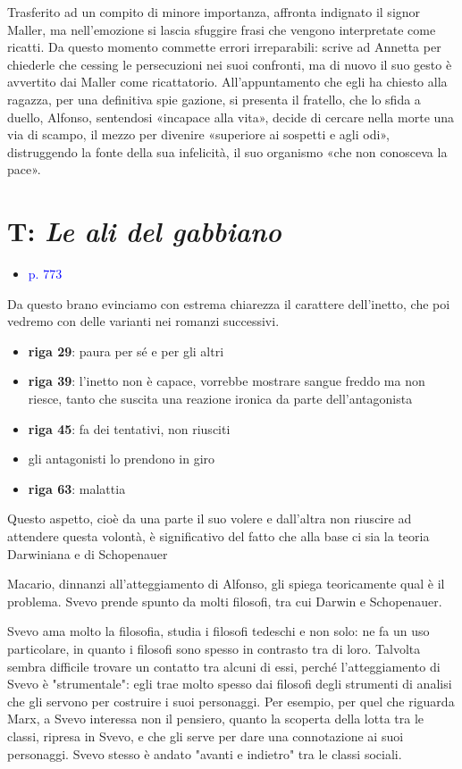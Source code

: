 \documentclass[a4paper, twoside, titlepage]{book}
\newcommand{\elenco}[1]{%
\begin{itemize}
#1
\end{itemize}}
\renewcommand{\emph}[1]{\textcolor{blue}{#1}}
\begin{document}
Trasferito ad un compito di minore importanza, affronta indignato il signor Maller, ma nell'emozione si lascia sfuggire frasi che vengono interpretate come ricatti. Da questo momento commette errori irreparabili: scrive ad Annetta per chiederle che cessing le persecuzioni nei suoi confronti, ma di nuovo il suo gesto è avvertito dai Maller come ricattatorio. All'appuntamento che egli ha chiesto alla ragazza, per una definitiva spie gazione, si presenta il fratello, che lo sfida a duello, Alfonso, sentendosi «incapace alla vita», decide di cercare nella morte una via di scampo, il mezzo per divenire «superiore ai sospetti e agli odi», distruggendo la fonte della sua infelicità, il suo organismo «che non conosceva la pace».

\section{T: \textit{Le ali del gabbiano}}
\elenco{\item \emph{p. 773}}

Da questo brano evinciamo con estrema chiarezza il carattere dell'inetto, che poi vedremo con delle varianti nei romanzi successivi.
\elenco{\item \textbf{riga 29}: paura per sé e per gli altri
\item \textbf{riga 39}: l'inetto non è capace, vorrebbe mostrare sangue freddo ma non riesce, tanto che suscita una reazione ironica da parte dell'antagonista 
\item \textbf{riga 45}: fa dei tentativi, non riusciti
\item gli antagonisti lo prendono in giro
\item \textbf{riga 63}: malattia}

Questo aspetto, cioè da una parte il suo volere e dall'altra non riuscire ad attendere questa volontà, è significativo del fatto che alla base ci sia la teoria Darwiniana e di Schopenauer

Macario, dinnanzi all'atteggiamento di Alfonso, gli spiega teoricamente qual è il problema. Svevo prende spunto da molti filosofi, tra cui Darwin e Schopenauer.

Svevo ama molto la filosofia, studia i filosofi tedeschi e non solo: ne fa un uso particolare, in quanto i filosofi sono spesso in contrasto tra di loro. Talvolta sembra difficile trovare un contatto tra alcuni di essi, perché l'atteggiamento di Svevo è "strumentale": egli trae molto spesso dai filosofi degli strumenti di analisi che gli servono per costruire i suoi personaggi.
Per esempio, per quel che riguarda Marx, a Svevo interessa non il pensiero, quanto la scoperta della lotta tra le classi, ripresa in Svevo, e che gli serve per dare una connotazione ai suoi personaggi.
Svevo stesso è andato "avanti e indietro" tra le classi sociali.
\end{document}
